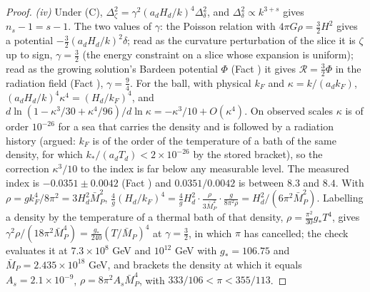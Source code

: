 \begin{proof}
\emph{(iv)} Under (C), $\Delta^{2}_{\zeta} = \gamma^{2}(a_{d}H_{d}/k)^{4}\Delta^{2}_{\delta}$, and $\Delta^{2}_{\delta} \propto k^{3 + s}$ gives $n_{s} - 1 = s - 1$. The two values of $\gamma$: the Poisson relation with $4\pi G\rho = \tfrac32H^{2}$ gives a potential $-\tfrac32(a_{d}H_{d}/k)^{2}\delta$; read as the curvature perturbation of the slice it is $\zeta$ up to sign, $\gamma = \tfrac32$ (the energy constraint on a slice whose expansion is uniform); read as the growing solution's Bardeen potential $\Phi$ (Fact ) it gives $\mathcal{R} = \tfrac32\Phi$ in the radiation field (Fact ), $\gamma = \tfrac94$. For the ball, with physical $k_{F}$ and $\kappa = k/(a_{d}k_{F})$, $(a_{d}H_{d}/k)^{4}\kappa^{4} = (H_{d}/k_{F})^{4}$, and $d\ln(1 - \kappa^{3}/30 + \kappa^{4}/96)/d\ln\kappa = -\kappa^{3}/10 + O(\kappa^{4})$. On observed scales $\kappa$ is of order $10^{-26}$ for a sea that carries the density and is followed by a radiation history (argued: $k_{F}$ is of the order of the temperature of a bath of the same density, for which $k_{*}/(a_{d}T_{d}) < 2 \times 10^{-26}$ by the stored bracket), so the correction $\kappa^{3}/10$ to the index is far below any measurable level. The measured index is $-0.0351 \pm 0.0042$ (Fact ) and $0.0351/0.0042$ is between $8.3$ and $8.4$. With $\rho = gk_{F}^{4}/8\pi^{2} = 3H_{d}^{2}\bar M_{P}^{2}$, $\tfrac4g(H_{d}/k_{F})^{4} = \tfrac4g H_{d}^{2}\cdot\tfrac{\rho}{3\bar M_{P}^{2}}\cdot\tfrac{g}{8\pi^{2}\rho} = H_{d}^{2}/(6\pi^{2}\bar M_{P}^{2})$. Labelling a density by the temperature of a thermal bath of that density, $\rho = \tfrac{\pi^{2}}{30}g_{*}T^{4}$, gives $\gamma^{2}\rho/(18\pi^{2}\bar M_{P}^{4}) = \tfrac{g_{*}}{240}(T/\bar M_{P})^{4}$ at $\gamma = \tfrac32$, in which $\pi$ has cancelled; the check evaluates it at $7.3 \times 10^{8}$ GeV and $10^{12}$ GeV with $g_{*} = 106.75$ and $\bar M_{P} = 2.435 \times 10^{18}$ GeV, and brackets the density at which it equals $A_{s} = 2.1 \times 10^{-9}$, $\rho = 8\pi^{2}A_{s}\bar M_{P}^{4}$, with $333/106 < \pi < 355/113$.


\end{proof}
